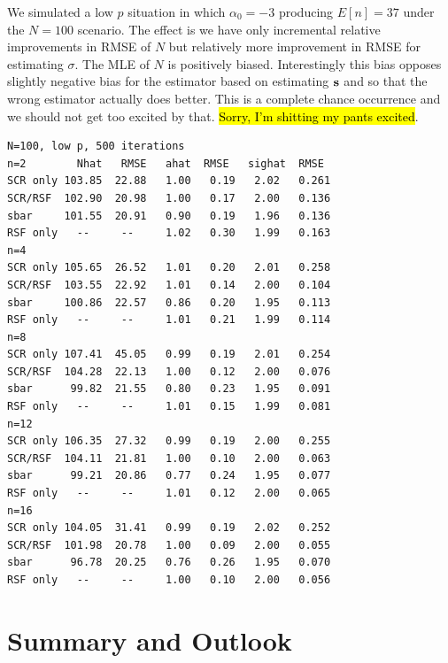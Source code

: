 We simulated a low $p$ situation in which $\alpha_{0}=-3$ producing
$E[n] = 37$ under the $N=100$ scenario.  The effect is we have only
incremental relative improvements in RMSE of $N$ but relatively more
improvement in RMSE for estimating $\sigma$. The MLE of
$N$ is positively biased.
Interestingly this bias opposes slightly negative bias for
the estimator based on estimating ${\bf s}$ and so that the wrong
estimator actually does better. This is a complete chance occurrence
and we should not get too excited by that. \hl{Sorry, I'm shitting my
  pants excited}.
{\small
\begin{verbatim}
N=100, low p, 500 iterations
n=2        Nhat   RMSE   ahat  RMSE   sighat  RMSE
SCR only 103.85  22.88   1.00   0.19   2.02   0.261
SCR/RSF  102.90  20.98   1.00   0.17   2.00   0.136
sbar     101.55  20.91   0.90   0.19   1.96   0.136
RSF only   --     --     1.02   0.30   1.99   0.163
n=4
SCR only 105.65  26.52   1.01   0.20   2.01   0.258
SCR/RSF  103.55  22.92   1.01   0.14   2.00   0.104
sbar     100.86  22.57   0.86   0.20   1.95   0.113
RSF only   --     --     1.01   0.21   1.99   0.114
n=8
SCR only 107.41  45.05   0.99   0.19   2.01   0.254
SCR/RSF  104.28  22.13   1.00   0.12   2.00   0.076
sbar      99.82  21.55   0.80   0.23   1.95   0.091
RSF only   --     --     1.01   0.15   1.99   0.081
n=12
SCR only 106.35  27.32   0.99   0.19   2.00   0.255
SCR/RSF  104.11  21.81   1.00   0.10   2.00   0.063
sbar      99.21  20.86   0.77   0.24   1.95   0.077
RSF only   --     --     1.01   0.12   2.00   0.065
n=16
SCR only 104.05  31.41   0.99   0.19   2.02   0.252
SCR/RSF  101.98  20.78   1.00   0.09   2.00   0.055
sbar      96.78  20.25   0.76   0.26   1.95   0.070
RSF only   --     --     1.00   0.10   2.00   0.056
\end{verbatim}
}

\section{Summary and Outlook}


